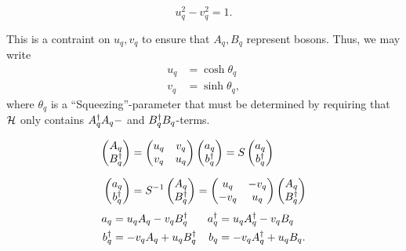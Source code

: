 \begin{tcolorbox}
	\begin{equation}
		u_{q}^2-v_{q}^{2} = 1.
	\end{equation}
\end{tcolorbox}
This is a contraint on $u_{q}, v_{q}$ to ensure that $A_{q}, B_{q}$ represent bosons. Thus, we may write
\begin{align}
	u_{q} &= \cosh\theta_{q} \\
	v_{q} &= \sinh\theta_{q},
\end{align}
where
$\theta_{q}$ is a ``Squeezing''-parameter that must be determined by requiring that $\mathcal{H}$ only contains $A_{q}^{\dagger}A_{q}-$ and $B_{q}^{\dagger}B_{q}$-terms. 

\begin{align}
	\begin{pmatrix}
		A_{q} \\ B_{q}^{\dagger}
	\end{pmatrix} &= \begin{pmatrix}
		u_{q} & v_{q} \\ v_{q} & u_{q}
	\end{pmatrix}\begin{pmatrix}
		a_{q} \\ b_{q}^{\dagger}
	\end{pmatrix} = S\begin{pmatrix}
		a_{q} \\ b_{q}^{\dagger}
	\end{pmatrix} \\[1.5ex]
	\begin{pmatrix}
		a_{q} \\ b_{q}^{\dagger}
	\end{pmatrix} &= S^{-1}\begin{pmatrix}
		A_{q} \\ B_{q}^{\dagger}
	\end{pmatrix} = \begin{pmatrix}
		u_{q} & -v_{q} \\ -v_{q} & u_{q}
	\end{pmatrix}\begin{pmatrix}
		A_{q} \\ B_{q}^{\dagger}
	\end{pmatrix}
\end{align}
\begin{align}
	a_{q} &= u_{q}A_{q}-v_{q}B_{q}^{\dagger} & a_{q}^{\dagger} &= u_{q}A_{q}^{\dagger}-v_{q}B_{q} \\
	b_{q}^{\dagger} &= -v_{q}A_{q} + u_{q}B_{q}^{\dagger} & b_{q} &= -v_{q}A_{q}^{\dagger} + u_{q}B_{q}.
\end{align}

